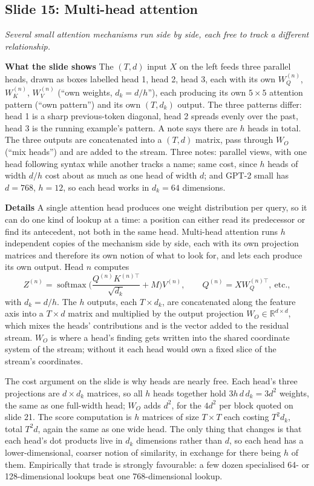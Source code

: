 \documentclass[11pt,letterpaper]{article}
\newcommand{\slide}[3]{%
  \subsection[Slide #1: #2]{Slide #1: #2}%
  {\color{muted}\itshape #3\par}\medskip}
\newcommand{\para}[1]{\medskip\noindent\textbf{#1}\quad}
\newcommand{\dk}{d_k}
\DeclareMathOperator{\softmax}{softmax}
\begin{document}
\slide{15}{Multi-head attention}{Several small attention mechanisms run side by side, each free to track a different relationship.}

\para{What the slide shows} The $(T,d)$ input $X$ on the left feeds three parallel heads, drawn as boxes labelled head 1, head 2, head 3, each with its own $W_Q^{(n)}$, $W_K^{(n)}$, $W_V^{(n)}$ (``own weights, $\dk=d/h$''), each producing its own $5\times5$ attention pattern (``own pattern'') and its own $(T,\dk)$ output. The three patterns differ: head 1 is a sharp previous-token diagonal, head 2 spreads evenly over the past, head 3 is the running example's pattern. A note says there are $h$ heads in total. The three outputs are concatenated into a $(T,d)$ matrix, pass through $W_O$ (``mix heads'') and are added to the stream. Three notes: parallel views, with one head following syntax while another tracks a name; same cost, since $h$ heads of width $d/h$ cost about as much as one head of width $d$; and GPT-2 small has $d=768$, $h=12$, so each head works in $\dk=64$ dimensions.

\para{Details} A single attention head produces one weight distribution per query, so it can do one kind of lookup at a time: a position can either read its predecessor or find its antecedent, not both in the same head. Multi-head attention runs $h$ independent copies of the mechanism side by side, each with its own projection matrices and therefore its own notion of what to look for, and lets each produce its own output. Head $n$ computes
\[
Z^{(n)}=\softmax\!\Big(\frac{Q^{(n)}K^{(n)\top}}{\sqrt{\dk}}+M\Big)V^{(n)},\qquad Q^{(n)}=XW_Q^{(n)\top},\ \text{etc.},
\]
with $\dk=d/h$. The $h$ outputs, each $T\times\dk$, are concatenated along the feature axis into a $T\times d$ matrix and multiplied by the output projection $W_O\in\mathbb{R}^{d\times d}$, which mixes the heads' contributions and is the vector added to the residual stream. $W_O$ is where a head's finding gets written into the shared coordinate system of the stream; without it each head would own a fixed slice of the stream's coordinates.

The cost argument on the slide is why heads are nearly free. Each head's three projections are $d\times\dk$ matrices, so all $h$ heads together hold $3h\,d\,\dk=3d^2$ weights, the same as one full-width head; $W_O$ adds $d^2$, for the $4d^2$ per block quoted on slide 21. The score computation is $h$ matrices of size $T\times T$ each costing $T^2\dk$, total $T^2d$, again the same as one wide head. The only thing that changes is that each head's dot products live in $\dk$ dimensions rather than $d$, so each head has a lower-dimensional, coarser notion of similarity, in exchange for there being $h$ of them. Empirically that trade is strongly favourable: a few dozen specialised 64- or 128-dimensional lookups beat one 768-dimensional lookup.
\end{document}
